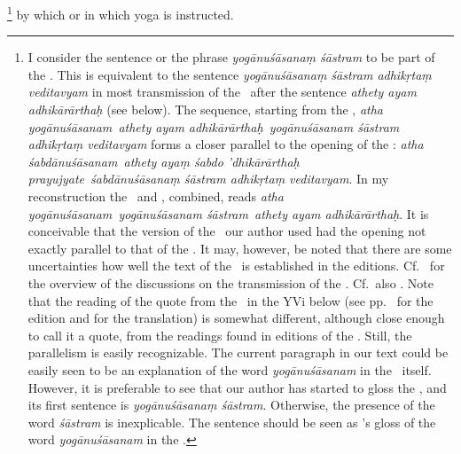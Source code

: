 \footnote{\label{VMBHEMU}I consider the sentence or the phrase \emph{yogānuśāsanaṃ śāstram} to be part of the \bhasya.  This is equivalent to the sentence \emph{yogānuśāsanaṃ śāstram adhikṛtaṃ veditavyam} in most transmission of the \YBh\ after the sentence \emph{athety ayam adhikārārthaḥ} (see below).  The sequence, starting from the \sutra, \emph{atha yogānuśāsanam\ddd\ athety ayam adhi\-kārā\-rthaḥ\dd\ yogānuśāsanam śāstram adhikṛtaṃ veditavyam} forms a closer parallel to the opening of the \VMBh: \emph{atha śa\-bdā\-nu\-śā\-sanam\dd\ athety ayaṃ śabdo ’dhikārārthaḥ prayujyate\dd\  śa\-bdā\-nu\-śā\-sa\-naṃ śā\-stram adhi\-kṛtaṃ ve\-di\-tavyam}.  In my reconstruction the \sutra\ and \bhasya, combined, reads \emph{atha yo\-gā\-nu\-śā\-sa\-nam\ddd\ yo\-gā\-nu\-śā\-sanam śā\-stram\dd\ athety ayam adhi\-kārā\-rthaḥ\dd}.  It is conceivable that the version of the \YBh\ our author used had the opening not exactly parallel to that of the \VMBh. It may, however, be noted that there are some uncertainties how well the text of the \VMBh\ is established in the editions. Cf.\ \citet[248--50]{cardona:1976} for the overview of the discussions on the transmission of the \VMBh. Cf.\ also \citet{witzel:1986}. Note that the reading of the quote from the \VMBh\ in the YVi below (see pp.\ \pageref{VMBH1138_E} for the edition and \pageref{VMBH1138_T} for the translation) is somewhat different, although close enough to call it a quote, from the readings found in editions of the \VMBh. Still, the parallelism is easily recognizable.  The current paragraph in our text could be easily seen to be an explanation of the word \emph{yogānuśāsanam} in the \sutra\ itself.  However, it is preferable to see that our author has started to gloss the \bhasya, and its first sentence is \emph{yogānuśāsanaṃ śāstram}.  Otherwise, the presence of the word \emph{śāstram} is inexplicable.  The sentence should be seen as \bhasya's gloss of the word \emph{yogānuśāsanam} in the \sutra.} by which or in which yoga is instructed.%


